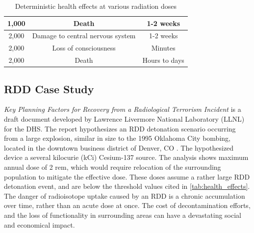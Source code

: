 \documentclass{report}
\begin{document}
\begin{table}
\begin{tabular}{|c|c|c|}
1,000                   & Death                            & 1-2 weeks                                  \\ \hline
2,000                   & Damage to central nervous system & 1-2 weeks                                  \\ \hline
2,000                   & Loss of consciousness            & Minutes                                    \\ \hline
2,000                   & Death                            & Hours to days                              \\ \hline
\end{tabular}
\caption[Deterministic health effects at various radiation doses \cite{USEPA1999}]{Deterministic health effects at various radiation doses \cite{USEPA1999} \footnotemark}
\label{tab:health_effects}
\end{table} 



 







\subsection{RDD Case Study}  \label{sec:case_study}

\emph{Key Planning Factors for Recovery from a Radiological Terrorism Incident} is a draft document developed by Lawrence Livermore National Laboratory (LLNL) for the DHS. The report hypothesizes an RDD detonation scenario occurring from a large explosion, similar in size to the 1995 Oklahoma City bombing, located in the downtown business district of Denver, CO \cite{Security2012}.  The hypothesized device a several kilocurie (kCi) Cesium-137 source.  The analysis shows maximum  annual dose of 2 rem, which would require relocation of the surrounding population to mitigate the effective dose.  These doses   assume a rather large RDD detonation event, and are below the threshold values cited in \autoref{tab:health_effects}.  The danger of radioisotope uptake caused by an RDD is a chronic accumulation over time, rather than an acute dose at once.  The cost of decontamination efforts, and the loss of functionality in surrounding areas can have a devastating social and economical impact.  
 
\end{document}
